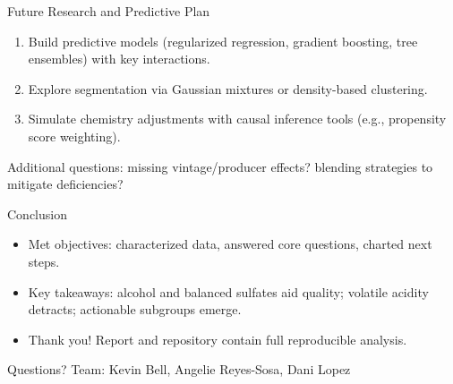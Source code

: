 \documentclass[aspectratio=169]{beamer}
\begin{document}
\begin{frame}{Future Research and Predictive Plan}
  \begin{enumerate}
    \item Build predictive models (regularized regression, gradient boosting, tree ensembles) with key interactions.
    \item Explore segmentation via Gaussian mixtures or density-based clustering.
    \item Simulate chemistry adjustments with causal inference tools (e.g., propensity score weighting).
  \end{enumerate}
  \vspace{0.5em}
  \small Additional questions: missing vintage/producer effects? blending strategies to mitigate deficiencies?
\end{frame}

\begin{frame}{Conclusion}
  \begin{itemize}
    \item Met objectives: characterized data, answered core questions, charted next steps.
    \item Key takeaways: alcohol and balanced sulfates aid quality; volatile acidity detracts; actionable subgroups emerge.
    \item Thank you! Report and repository contain full reproducible analysis.
  \end{itemize}
\end{frame}

\begin{frame}[standout]
  Questions?\newline
  \small Team: Kevin Bell, Angelie Reyes-Sosa, Dani Lopez\
\end{frame}
\end{document}
